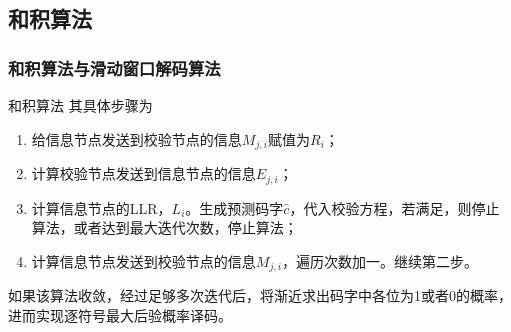 \documentclass{beamer}
\begin{document}
\subsection{和积算法}
\begin{frame}[shrink]
	\frametitle{和积算法与滑动窗口解码算法}
		\begin{block}{和积算法}
		其具体步骤为
\begin{enumerate}
\item 给信息节点发送到校验节点的信息$M_{j,i}$赋值为$R_i$；
\item 计算校验节点发送到信息节点的信息$E_{j,i}$；
\item 计算信息节点的LLR，$L_i$。生成预测码字$\hat{c}$，代入校验方程，若满足，则停止算法，或者达到最大迭代次数，停止算法；
\item 计算信息节点发送到校验节点的信息$M_{j,i}$，遍历次数加一。继续第二步。
\end{enumerate}
如果该算法收敛，经过足够多次迭代后，将渐近求出码字中各位为1或者0的概率，进而实现逐符号最大后验概率译码。
		\end{block}
\end{frame}
\end{document}
